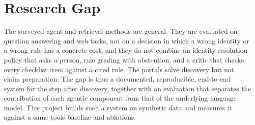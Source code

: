 \section{Research Gap}
The surveyed agent and retrieval methods are general. They are evaluated on question answering and web tasks, not on a decision in which a wrong identity or a wrong rule has a concrete cost, and they do not combine an identity-resolution policy that asks a person, rule grading with abstention, and a critic that checks every checklist item against a cited rule. The portals solve discovery but not claim preparation. The gap is thus a documented, reproducible, end-to-end system for the step after discovery, together with an evaluation that separates the contribution of each agentic component from that of the underlying language model. This project builds such a system on synthetic data and measures it against a same-tools baseline and ablations.
